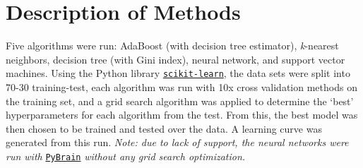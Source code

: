 \section{Description of Methods}
Five algorithms were run: AdaBoost (with decision tree estimator), \textit{k}-nearest neighbors, decision tree (with Gini index), neural network, and support vector machines. Using the Python library \href{http://scikit-learn.org/stable/}{\texttt{scikit-learn}}, the data sets were split into 70-30 training-test, each algorithm was run with 10x cross validation methods on the training set, and a grid search algorithm was applied to determine the `best' hyperparameters for each algorithm from the test. From this, the best model was then chosen to be trained and tested over the data. A learning curve was generated from this run. \textit{Note: due to lack of support, the neural networks were run with} \href{http://pybrain.org}{\texttt{PyBrain}} \textit{without any grid search optimization.}